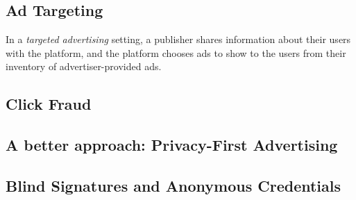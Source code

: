 \subsection{Ad Targeting}

%
In a \emph{targeted advertising} setting, a publisher shares information about
their users with the platform, and the platform chooses ads to show to the
users from their inventory of advertiser-provided ads.
%


\subsection{Click Fraud}

\subsection{A better approach: Privacy-First Advertising}

\subsection{Blind Signatures and Anonymous Credentials}
